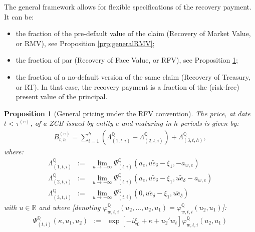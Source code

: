 \documentclass[
  12pt,
]{book}
\providecommand{\tightlist}{%
  \setlength{\itemsep}{0pt}\setlength{\parskip}{0pt}}
\newtheorem{proposition}{Proposition}[chapter]
\theoremstyle{definition}
\theoremstyle{definition}
\theoremstyle{definition}
\theoremstyle{definition}
\theoremstyle{remark}
\begin{document}
The general framework allows for flexible specifications of the recovery payment. It can be:

\begin{itemize}
\tightlist
\item
  the fraction of the pre-default value of the claim (Recovery of Market Value, or RMV), see Proposition \ref{prp:generalRMV};
\item
  the fraction of par (Recovery of Face Value, or RFV), see Proposition \ref{prp:generalRFV};
\item
  the fraction of a no-default version of the same claim (Recovery of Treasury, or RT). In that case, the recovery payment is a fraction of the (risk-free) present value of the principal.
\end{itemize}

\begin{proposition}[General pricing under the RFV convention]
\protect\hypertarget{prp:generalRFV}{}\label{prp:generalRFV}The price, at date \(t < \tau^{(e)}\), of a ZCB issued by entity \(e\) and maturing in \(h\) periods is given by:
\begin{equation}
\begin{array}{lll}
\boxed{B^{(e)}_{t,h} = \sum_{i = 1}^{h} \left( \Lambda^{\mathbb{Q}}_{(1, t, i)} - \Lambda^{\mathbb{Q}}_{(2, t, i)} \right) + \Lambda^{\mathbb{Q}}_{(3, t, h)} ,}
\end{array}\label{eq:ZCBRFV1}
\end{equation}
where:
\begin{equation}
\begin{array}{lll}
\Lambda_{(1,t,i)}^{\mathbb{Q}} &:=& \underset{u \rightarrow - \infty}{\lim} \Psi^{\mathbb{Q}}_{(t, i)} (a_e , u \widetilde{e}_\delta - \xi_1, - a_{w,e}) \\
\Lambda_{(2,t,i)}^{\mathbb{Q}} &:=& \underset{u \rightarrow - \infty}{\lim} \Psi^{\mathbb{Q}}_{(t, i)} (a_e , u \widetilde{e}_\delta - \xi_1,u \widetilde{e}_\delta - a_{w,e} ) \\
\Lambda_{(3,t,i)}^{\mathbb{Q}} &:=& \underset{u \rightarrow - \infty}{\lim} \Psi^{\mathbb{Q}}_{(t, i)} (0 , u \widetilde{e}_\delta - \xi_1,u \widetilde{e}_\delta)
\end{array}\label{eq:ZCBRFV2}
\end{equation}
with \(u \in \mathbb{R}\) and where {[}denoting \(\varphi^{\mathbb{Q}}_{w, t, i} \left(u_2, \ldots, u_2 , u_1 \right) = \varphi^{\mathbb{Q}}_{w, t, i} \left( u_2 , u_1 \right)\){]}:
\begin{equation}
\begin{array}{lll}
\Psi^{\mathbb{Q}}_{(t, i)} (\kappa , u_1, u_2) &:=& \exp \left[ -i \xi_0 + \kappa + u_2 ' w_t \right]   \varphi_{w,t,i}^{\mathbb{Q}}(u_2, u_1)
\end{array}\label{eq:ZCBRFV3}
\end{equation}
\end{proposition}
\end{document}
